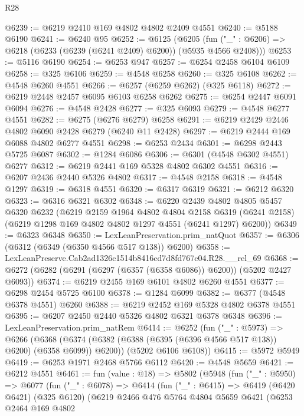 \begin{lexlean}{R28}
\begin{coremodule}
@6239 := @6219 @2410 @169 @4802 @4802 @2409 @4551
@6240 := @5188 @6190
@6241 := @6240 @95
@6252 := @6125
    (@6205 (fun ("_" : @6206) => @6218 (@6233 (@6239 (@6241 @2409) @6200)) (@5935 @4566 @2408)))
@6253 := @5116 @6190
@6254 := @6253 @947
@6257 := @6254 @2458 @6104 @6109
@6258 := @325 @6106
@6259 := @4548 @6258
@6260 := @325 @6108
@6262 := @4548 @6260 @4551
@6266 := @6257 (@6259 @6262) (@325 @6118)
@6272 := @6219 @2448 @2457 @6095 @6103 @6258 @6262
@6275 := @6254 @2447 @6091 @6094
@6276 := @4548 @2428
@6277 := @325 @6093
@6279 := @4548 @6277 @4551
@6282 := @6275 (@6276 @6279) @6258
@6291 := @6219 @2429 @2446 @4802 @6090 @2428 @6279 (@6240 @11 @2428)
@6297 := @6219 @2444 @169 @6088 @4802 @6277 @4551
@6298 := @6253 @2434
@6301 := @6298 @2443 @5725 @6087
@6302 := @1284 @6086
@6306 := @6301 (@4548 @6302 @4551) @6277
@6312 := @6219 @2441 @169 @5328 @4802 @6302 @4551
@6316 := @6207 @2436 @2440 @5326 @4802
@6317 := @4548 @2158
@6318 := @4548 @1297
@6319 := @6318 @4551
@6320 := @6317 @6319
@6321 := @6212 @6320
@6323 := @6316 @6321 @6302
@6348 := @6220
    @2439
    @4802
    @4805
    @5457
    @6320
    @6232
    (@6219
      @2159
      @1964
      @4802
      @4804
      @2158
      @6319
      (@6241 @2158)
      (@6219 @1298 @169 @4802 @4802 @1297 @4551 (@6241 @1297) @6200))
@6349 := @6323 @6348
@6350 := LexLeanPreservation.prim_natQuot
@6357 := @6306 (@6312 (@6349 (@6350 @4566 @517 @138)) @6200)
@6358 := LexLeanPreserve.Cab2ad1326c1514b8416cd7d8fd767c04.R28.__rel_69
@6368 := @6272 (@6282 (@6291 (@6297 (@6357 (@6358 @6086)) @6200)) (@5202 @2427 @6093))
@6374 := @6219 @2455 @169 @6101 @4802 @6260 @4551
@6377 := @6298 @2454 @5725 @6100
@6378 := @1284 @6099
@6382 := @6377 (@4548 @6378 @4551) @6260
@6388 := @6219 @2452 @169 @5328 @4802 @6378 @4551
@6395 := @6207 @2450 @2440 @5326 @4802 @6321 @6378 @6348
@6396 := LexLeanPreservation.prim_natRem
@6414 := @6252
    (fun ("_" : @5973) =>
    @6266
      (@6368 (@6374 (@6382 (@6388 (@6395 (@6396 @4566 @517 @138)) @6200) (@6358 @6099)) @6200))
      (@5202 @6106 @6108))
@6415 := @5972 @5949
@6419 := @6253 @1971 @2468 @5766 @6112
@6420 := @4548 @5659
@6421 := @6212 @4551
@6461 := fun (value : @18) =>
  @5802
    (@5948
      (fun ("_" : @5950) =>
      @6077
        (fun ("_" : @6078) =>
        @6414
          (fun ("_" : @6415) =>
          @6419
            (@6420 @6421)
            (@325 @6120)
            (@6219
              @2466
              @476
              @5764
              @4804
              @5659
              @6421
              (@6253
                @2464
                @169
                @4802

\end{coremodule}
\end{lexlean}
